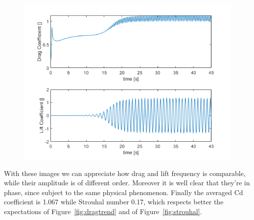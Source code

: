 \documentclass[12pt]{article}
\begin{document}
            \begin{figure}[!ht]
                \includegraphics[width=\textwidth]{drag_vs_lift_2_Federica.png}
                \centering
                \caption{}
                \label{fig:drag_vsl2}
        \end{figure}
        
        With these images we can appreciate how drag and lift frequency is comparable, while their amplitude is of different order. Moreover it is well clear that they're in phase, since subject to the same physical phenomenon. Finally the averaged Cd coefficient is 1.067 while Strouhal number 0.17, which respects better the expectations of Figure~\ref{fig:dragtrend} and of Figure~\ref{fig:strouhal}.
     



\end{document}
